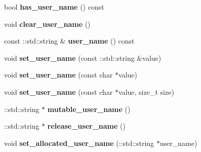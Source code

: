 \begin{DoxyCompactItemize}
\item 
\hypertarget{classSimpleChat_1_1ChatTarget_a66e0bc40c78d2b66c9fb9afbf2c5953e}{bool {\bfseries has\-\_\-user\-\_\-name} () const }\label{classSimpleChat_1_1ChatTarget_a66e0bc40c78d2b66c9fb9afbf2c5953e}

\item 
\hypertarget{classSimpleChat_1_1ChatTarget_aabc592535549d57aeb35790ba8a082aa}{void {\bfseries clear\-\_\-user\-\_\-name} ()}\label{classSimpleChat_1_1ChatTarget_aabc592535549d57aeb35790ba8a082aa}

\item 
\hypertarget{classSimpleChat_1_1ChatTarget_a9a4f84c9215e5e3f6b8cbe325008632e}{const \-::std\-::string \& {\bfseries user\-\_\-name} () const }\label{classSimpleChat_1_1ChatTarget_a9a4f84c9215e5e3f6b8cbe325008632e}

\item 
\hypertarget{classSimpleChat_1_1ChatTarget_ae0dfb8025905103704facea22ff305fd}{void {\bfseries set\-\_\-user\-\_\-name} (const \-::std\-::string \&value)}\label{classSimpleChat_1_1ChatTarget_ae0dfb8025905103704facea22ff305fd}

\item 
\hypertarget{classSimpleChat_1_1ChatTarget_a1853ab22e4f8153ceca6e764c9b2b3bc}{void {\bfseries set\-\_\-user\-\_\-name} (const char $\ast$value)}\label{classSimpleChat_1_1ChatTarget_a1853ab22e4f8153ceca6e764c9b2b3bc}

\item 
\hypertarget{classSimpleChat_1_1ChatTarget_a3d3431afad65e465a73cff3bc9b466fb}{void {\bfseries set\-\_\-user\-\_\-name} (const char $\ast$value, size\-\_\-t size)}\label{classSimpleChat_1_1ChatTarget_a3d3431afad65e465a73cff3bc9b466fb}

\item 
\hypertarget{classSimpleChat_1_1ChatTarget_ab5f2b7a7ca18ba806baf74e55cab4ff3}{\-::std\-::string $\ast$ {\bfseries mutable\-\_\-user\-\_\-name} ()}\label{classSimpleChat_1_1ChatTarget_ab5f2b7a7ca18ba806baf74e55cab4ff3}

\item 
\hypertarget{classSimpleChat_1_1ChatTarget_a0ce718bcee6d70ec92bf5e0b74b10f7d}{\-::std\-::string $\ast$ {\bfseries release\-\_\-user\-\_\-name} ()}\label{classSimpleChat_1_1ChatTarget_a0ce718bcee6d70ec92bf5e0b74b10f7d}

\item 
\hypertarget{classSimpleChat_1_1ChatTarget_a82559c41d4d25af52c6a5f83814eac69}{void {\bfseries set\-\_\-allocated\-\_\-user\-\_\-name} (\-::std\-::string $\ast$user\-\_\-name)}\label{classSimpleChat_1_1ChatTarget_a82559c41d4d25af52c6a5f83814eac69}


\end{DoxyCompactItemize}
